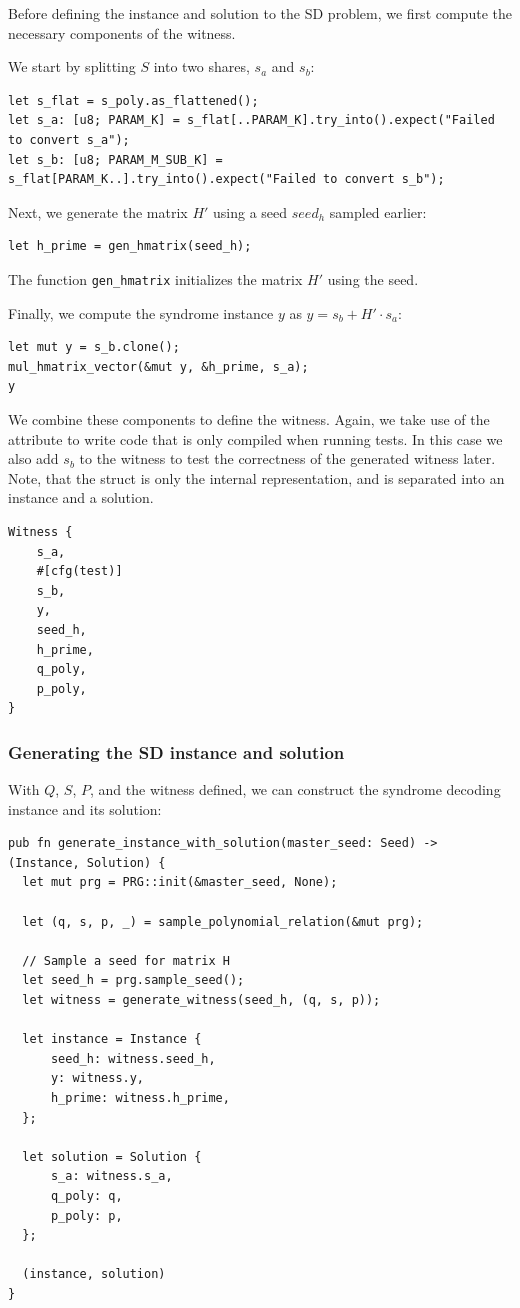 \documentclass[11pt]{report}
\theoremstyle{definition}
\theoremstyle{plain}
\begin{document}
Before defining the instance and solution to the SD problem, we first compute the necessary components of the witness.

We start by splitting $S$ into two shares, $s_a$ and $s_b$:

\begin{verbatim}
let s_flat = s_poly.as_flattened();
let s_a: [u8; PARAM_K] = s_flat[..PARAM_K].try_into().expect("Failed to convert s_a");
let s_b: [u8; PARAM_M_SUB_K] = s_flat[PARAM_K..].try_into().expect("Failed to convert s_b");
\end{verbatim}

Next, we generate the matrix $H'$ using a seed $seed_h$ sampled earlier:

\begin{verbatim}
let h_prime = gen_hmatrix(seed_h);
\end{verbatim}

The function \texttt{gen\_hmatrix} initializes the matrix $H'$ using the seed.

Finally, we compute the syndrome instance $y$ as $y = s_b + H' \cdot s_a$:

\begin{verbatim}
let mut y = s_b.clone();
mul_hmatrix_vector(&mut y, &h_prime, s_a);
y
\end{verbatim}

We combine these components to define the witness. Again, we take use of the  attribute to write code that is only compiled when running tests. In this case we also add $s_b$ to the witness to test the correctness of the generated witness later. Note, that the  struct is only the internal representation, and is separated into an instance and a solution.

\begin{verbatim}
Witness {
    s_a,
    #[cfg(test)]
    s_b,
    y,
    seed_h,
    h_prime,
    q_poly,
    p_poly,
}
\end{verbatim}

\subsubsection{Generating the SD instance and solution}

With $Q$, $S$, $P$, and the witness defined, we can construct the syndrome decoding instance and its solution:

\begin{verbatim}
pub fn generate_instance_with_solution(master_seed: Seed) -> (Instance, Solution) {
  let mut prg = PRG::init(&master_seed, None);

  let (q, s, p, _) = sample_polynomial_relation(&mut prg);

  // Sample a seed for matrix H
  let seed_h = prg.sample_seed();
  let witness = generate_witness(seed_h, (q, s, p));

  let instance = Instance {
      seed_h: witness.seed_h,
      y: witness.y,
      h_prime: witness.h_prime,
  };

  let solution = Solution {
      s_a: witness.s_a,
      q_poly: q,
      p_poly: p,
  };

  (instance, solution)
}
\end{verbatim}
\end{document}
